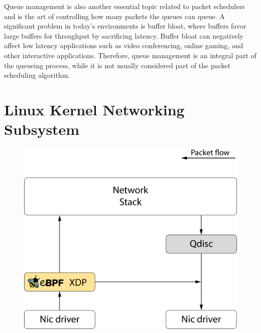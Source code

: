 \documentclass[sigconf, nonacm]{acmart}
\begin{document}
Queue management is also another essential topic related to packet schedulers and is the art of controlling how many packets the queues can queue. A significant problem in today's environments is buffer bloat, where buffers favor large buffers for throughput by sacrificing latency. Buffer bloat can negatively affect low latency applications such as video conferencing, online gaming, and other interactive applications. Therefore, queue management is an integral part of the queueing process, while it is not usually considered part of the packet scheduling algorithm.


\section{Linux Kernel Networking Subsystem}

\begin{figure}
  \includegraphics[width=\linewidth]{network-overview.pdf}
  \caption{\label{fig:network_overview}}
\end{figure}
\end{document}
